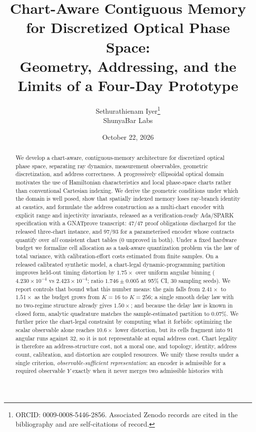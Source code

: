 \documentclass[11pt]{article}
\title{Chart-Aware Contiguous Memory for Discretized Optical Phase Space:\\
Geometry, Addressing, and the Limits of a Four-Day Prototype}
\author{Sethurathienam Iyer\thanks{ORCID: 0009-0008-5446-2856.
Associated Zenodo records are cited in the bibliography and are self-citations of record.}\\
ShunyaBar Labs}
\date{October 22, 2026}
\begin{document}
\maketitle

\begin{abstract}
We develop a chart-aware, contiguous-memory architecture for discretized optical
phase space, separating ray dynamics, measurement observables, geometric
discretization, and address correctness. A progressively ellipsoidal optical domain
motivates the use of Hamiltonian characteristics and local phase-space charts rather
than conventional Cartesian indexing. We derive the geometric conditions under which
the domain is well posed, show that spatially indexed memory loses ray-branch identity
at caustics, and formulate the address construction as a multi-chart encoder with
explicit range and injectivity invariants, released as a verification-ready Ada/SPARK
specification with a GNATprove transcript: 47/47 proof obligations discharged for the
released three-chart instance, and 97/93 for a parameterised encoder whose contracts
quantify over \emph{all} consistent chart tables (0 unproved in both). Under a fixed hardware
budget we formalize cell allocation as a task-aware quantization problem via the law of
total variance, with calibration-effort costs estimated from finite samples. On a
released calibrated synthetic model, a chart-legal dynamic-programming partition
improves held-out timing distortion by $\mathbf{1.75\times}$ over uniform angular binning
($4.230\times10^{-4}$ vs $2.423\times10^{-4}$; ratio $1.746\pm0.005$ at 95\% CI, 30
sampling seeds). We report controls that bound what this number means: the gain falls
from $2.41\times$ to $1.51\times$ as the budget grows from $K=16$ to $K=256$; a single
smooth delay law with no two-regime structure already gives $1.50\times$; and because
the delay law is known in closed form, analytic quadrature matches the sample-estimated
partition to $0.07\%$. We further price the chart-legal constraint by computing what it
forbids: optimizing the scalar observable alone reaches $10.6\times$ lower distortion,
but its cells fragment into $91$ angular runs against $32$, so it is not
representable at equal address cost. Chart legality is therefore an
address-structure cost, not a moral one, and topology, identity, address count,
calibration, and distortion are coupled resources. We unify these results under a single
criterion, \emph{observable-sufficient representation}: an encoder is admissible for a
required observable $Y$ exactly when it never merges two admissible histories with

\end{abstract}
\end{document}
